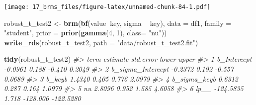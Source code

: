 \documentclass[]{book}
\newenvironment{Shaded}{\begin{snugshade}}{\end{snugshade}}
\newcommand{\KeywordTok}[1]{\textcolor[rgb]{0.13,0.29,0.53}{\textbf{#1}}}
\newcommand{\DataTypeTok}[1]{\textcolor[rgb]{0.13,0.29,0.53}{#1}}
\newcommand{\DecValTok}[1]{\textcolor[rgb]{0.00,0.00,0.81}{#1}}
\newcommand{\FloatTok}[1]{\textcolor[rgb]{0.00,0.00,0.81}{#1}}
\newcommand{\StringTok}[1]{\textcolor[rgb]{0.31,0.60,0.02}{#1}}
\newcommand{\CommentTok}[1]{\textcolor[rgb]{0.56,0.35,0.01}{\textit{#1}}}
\newcommand{\OperatorTok}[1]{\textcolor[rgb]{0.81,0.36,0.00}{\textbf{#1}}}
\newcommand{\NormalTok}[1]{#1}
\begin{document}
\begin{Shaded}
\end{Shaded}

\texttt{[image: 17\_brms\_files/figure-latex/unnamed-chunk-84-1.pdf]}

\begin{Shaded}
\begin{Highlighting}[]
\NormalTok{robust_t_test2 <-}\StringTok{ }\KeywordTok{brm}\NormalTok{(}\KeywordTok{bf}\NormalTok{(value}\OperatorTok{~}\NormalTok{key, sigma }\OperatorTok{~}\StringTok{ }\NormalTok{key), }
            \DataTypeTok{data =}\NormalTok{ df1, }
            \DataTypeTok{family =} \StringTok{"student"}\NormalTok{, }
            \DataTypeTok{prior =} \KeywordTok{prior}\NormalTok{(}\KeywordTok{gamma}\NormalTok{(}\DecValTok{4}\NormalTok{, }\DecValTok{1}\NormalTok{), }\DataTypeTok{class=} \StringTok{"nu"}\NormalTok{))}
\KeywordTok{write_rds}\NormalTok{(robust_t_test2, }\DataTypeTok{path =} \StringTok{"data/robust_t_test2.fit"}\NormalTok{)}
\end{Highlighting}
\end{Shaded}

\begin{Shaded}
\begin{Highlighting}[]
\KeywordTok{tidy}\NormalTok{(robust_t_test2)}
\CommentTok{#>                term  estimate std.error    lower     upper}
\CommentTok{#> 1       b_Intercept   -0.0961     0.188   -0.410    0.2049}
\CommentTok{#> 2 b_sigma_Intercept   -0.2372     0.192   -0.557    0.0689}
\CommentTok{#> 3            b_keyb    1.4340     0.405    0.776    2.0979}
\CommentTok{#> 4      b_sigma_keyb    0.6312     0.287    0.164    1.0979}
\CommentTok{#> 5                nu    2.8096     0.952    1.585    4.6058}
\CommentTok{#> 6              lp__ -124.5835     1.718 -128.006 -122.5280}
\end{Highlighting}
\end{Shaded}
\end{document}
